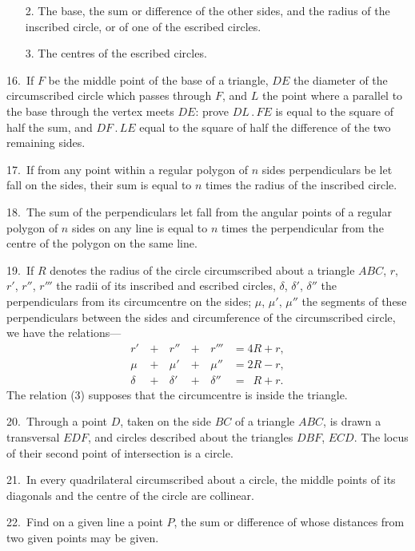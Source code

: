 \documentclass[oneside]{book}
\begin{document}
\begin{footnotesize}
\begin{changemargin}{0.3in}{0in}
\begin{enumerate}
\item[2.] The base, the sum or difference of the other sides, and
the radius of the inscribed circle, or of one of the
escribed circles.

\item[3.] The centres of the escribed circles.
\end{enumerate}
\end{changemargin}

16.~If $F$ be the middle point of the base of a triangle, $DE$ the
diameter of the circumscribed circle which passes through $F$, and
$L$ the point where a parallel to the base through the vertex meets
$DE$: prove $DL\,.\,FE$ is equal to the square of half the sum, and
$DF\,.\,LE$ equal to the square of half the difference of the two remaining
sides.

17.~If from any point within a regular polygon of $n$ sides perpendiculars
be let fall on the sides, their sum is equal to $n$ times
the radius of the inscribed circle.

18.~The sum of the perpendiculars let fall from the angular
points of a regular polygon of $n$ sides on any line is equal to
$n$ times the perpendicular from the centre of the polygon on the
same line.

19.~If $R$ denotes the radius of the circle circumscribed about a
triangle $ABC$, $r$, $r'$, $r''$, $r'''$ the radii of its inscribed and escribed
circles, $\delta$, $\delta'$, $\delta''$ the perpendiculars from its circumcentre on the
sides; $\mu$, $\mu'$, $\mu''$ the segments of these perpendiculars between the
sides and circumference of the circumscribed circle, we have the
relations---
\begin{alignat}{3}
 r' &\,+\, &r'' &\,+\, &r''' &= 4R + r,  \\
 \mu &\,+\, &\mu' &\,+\, &\mu'' &= 2R - r,  \\
 \delta &\,+\, &\delta' &\,+\, &\delta'' &= \phantom{0}R + r.
\end{alignat}
The relation (3) supposes that the circumcentre is inside the
triangle.

20.~Through a point $D$, taken on the side $BC$ of a triangle
$ABC$, is drawn a transversal $EDF$, and circles described about
the triangles $DBF$, $ECD$. The locus of their second point of
intersection is a circle.

21.~In every quadrilateral circumscribed about a circle, the
middle points of its diagonals and the centre of the circle are
collinear.

22.~Find on a given line a point $P$, the sum or difference of
whose distances from two given points may be given.


\end{footnotesize}
\end{document}
